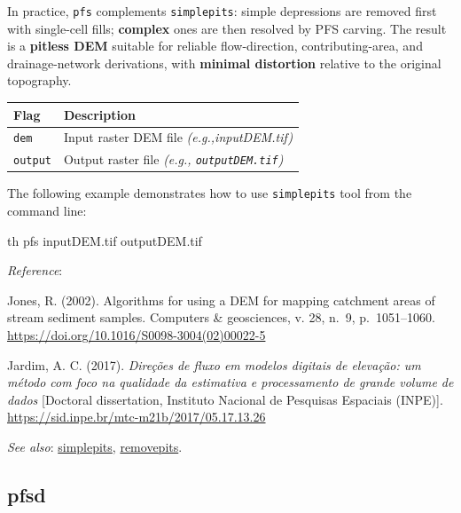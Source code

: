 \documentclass[
]{book}
\newenvironment{Shaded}{\begin{snugshade}}{\end{snugshade}}
\newcommand{\ExtensionTok}[1]{#1}
\newcommand{\NormalTok}[1]{#1}
\theoremstyle{definition}
\theoremstyle{definition}
\theoremstyle{definition}
\theoremstyle{definition}
\theoremstyle{remark}
\begin{document}
In practice, \texttt{pfs} complements \texttt{simplepits}: simple depressions are removed first with single-cell fills; \textbf{complex} ones are then resolved by PFS carving. The result is a \textbf{pitless DEM} suitable for reliable flow-direction, contributing-area, and drainage-network derivations, with \textbf{minimal distortion} relative to the original topography.

\begin{longtable}[]{@{}ll@{}}
\toprule\noalign{}
Flag & Description \\
\midrule\noalign{}
\endhead
\bottomrule\noalign{}
\endlastfoot
\texttt{dem} & Input raster DEM file \emph{(e.g.,inputDEM.tif)} \\
\texttt{output} & Output raster file \emph{(e.g., \texttt{outputDEM.tif})} \\
\end{longtable}

The following example demonstrates how to use \texttt{simplepits} tool from the command line:

\begin{Shaded}
\begin{Highlighting}[]
\ExtensionTok{th}\NormalTok{ pfs inputDEM.tif outputDEM.tif}
\end{Highlighting}
\end{Shaded}

\emph{Reference}:

Jones, R. (2002). Algorithms for using a DEM for mapping catchment areas of stream sediment samples. Computers \& geosciences, v. 28, n.~9, p.~1051--1060. \url{https://doi.org/10.1016/S0098-3004(02)00022-5}

Jardim, A. C. (2017). \emph{Direções de fluxo em modelos digitais de elevação: um método com foco na qualidade da estimativa e processamento de grande volume de dados} {[}Doctoral dissertation, Instituto Nacional de Pesquisas Espaciais (INPE){]}. \href{http://mtc-m21b.sid.inpe.br/col/sid.inpe.br/mtc-m21b/2017/05.17.13.26/doc/publicacao.pdf?metadatarepository=sid.inpe.br/mtc-m21b/2017/05.17.13.26.57&mirror=sid.inpe.br/mtc-m21b/2013/09.26.14.25.22&languagebutton=en}{https://sid.inpe.br/mtc-m21b/2017/05.17.13.26}

\emph{See also}: \hyperref[simplepits]{simplepits}, \hyperref[removepits]{removepits}.

\subsection{pfsd}\label{pfsd}
\end{document}
